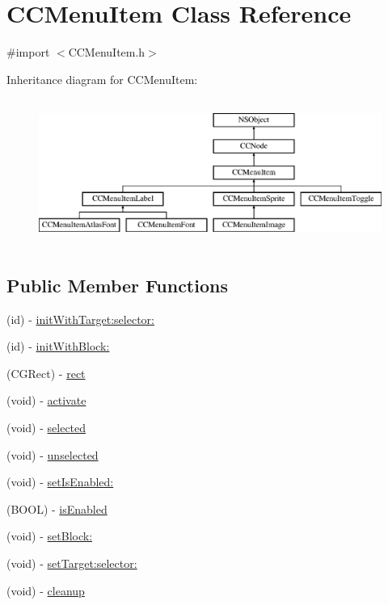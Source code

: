 \hypertarget{interface_c_c_menu_item}{\section{C\-C\-Menu\-Item Class Reference}
\label{interface_c_c_menu_item}
}


{\ttfamily \#import $<$C\-C\-Menu\-Item.\-h$>$}

Inheritance diagram for C\-C\-Menu\-Item\-:\begin{figure}[H]
\begin{center}
\leavevmode
\includegraphics[height=4.827586cm]{interface_c_c_menu_item}
\end{center}
\end{figure}
\subsection*{Public Member Functions}
\begin{DoxyCompactItemize}
\item 
(id) -\/ \hyperlink{interface_c_c_menu_item_a4afdae0135fad8af1af3ccaab32d2a20}{init\-With\-Target\-:selector\-:}
\item 
(id) -\/ \hyperlink{interface_c_c_menu_item_a99fcd316228f6ab25357dace5e4f7e13}{init\-With\-Block\-:}
\item 
(C\-G\-Rect) -\/ \hyperlink{interface_c_c_menu_item_aa26efb098a0faaeb065b2c9c10e0bc5b}{rect}
\item 
(void) -\/ \hyperlink{interface_c_c_menu_item_a9fb8a6c00cb5099da753fa7a61b41d48}{activate}
\item 
(void) -\/ \hyperlink{interface_c_c_menu_item_a7bf84326015fc21927f5ab3b3d7487ab}{selected}
\item 
(void) -\/ \hyperlink{interface_c_c_menu_item_a804466c2db6ba37483e374118bde4e1c}{unselected}
\item 
(void) -\/ \hyperlink{interface_c_c_menu_item_a53be17d01c203759053fe58b4cfb7bc6}{set\-Is\-Enabled\-:}
\item 
(B\-O\-O\-L) -\/ \hyperlink{interface_c_c_menu_item_a823d5ad50e81e2f41cc99580a7fc8776}{is\-Enabled}
\item 
(void) -\/ \hyperlink{interface_c_c_menu_item_ae3a3282d2ac326af5e02773409b628a5}{set\-Block\-:}
\item 
(void) -\/ \hyperlink{interface_c_c_menu_item_a58d8f2c72697ea34cf1e10b82cac81ff}{set\-Target\-:selector\-:}
\item 
(void) -\/ \hyperlink{interface_c_c_menu_item_a9dacc63a07fd86adb30bd6c4ee28d47b}{cleanup}
\end{DoxyCompactItemize}
